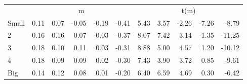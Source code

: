 \begin{table}[!ht]
\begin{tabular}{lrrrrrrrrrr}
      & \multicolumn{5}{c}{m} & \multicolumn{5}{c}{t(m)}
    
    \\
      \cmidrule(r){2-6} \cmidrule(r){7-11}

    Small   & 0.11  & 0.07  & -0.05  & -0.19  & -0.41  & 5.43  & 3.57  & -2.26  & -7.26  & -8.79  \\
         2  & 0.16  & 0.16  & 0.07  & -0.03  & -0.37  & 8.07  & 7.42  & 3.14  & -1.35  & -11.25  \\
         3  & 0.18  & 0.10  & 0.11  & 0.03  & -0.31  & 8.88  & 5.00  & 4.57  & 1.20  & -10.12  \\
         4  & 0.18  & 0.09  & 0.09  & 0.02  & -0.30  & 7.43  & 3.90  & 3.72  & 0.85  & -9.61  \\
    Big     & 0.14  & 0.12  & 0.08  & 0.01  & -0.20  & 6.40  & 6.59  & 4.69  & 0.30  & -6.42  \\

  

  \bottomrule
\end{tabular}
\label{tbl:25_Size_Var_C1997b}
\end{table}